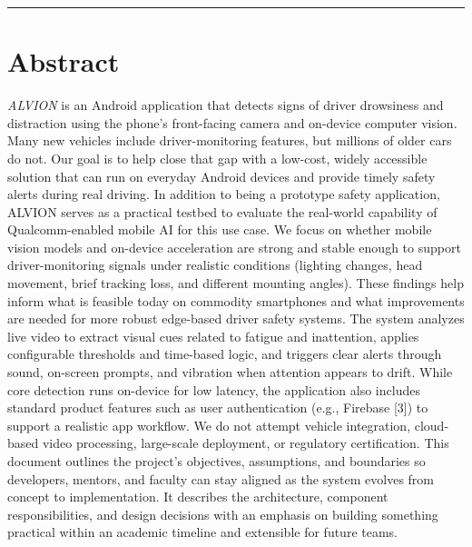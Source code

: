 \documentclass[11pt]{report}
\begin{document}


\clearpage

\setcounter{page}{1}



\tableofcontents
{\color{qcRed}\rule{16cm}{2pt}}

\clearpage

\chapter{Abstract}
\textit{ALVION} is an Android application that detects signs of driver drowsiness and distraction using the phone’s front-facing camera and on-device computer vision. Many new vehicles include driver-monitoring features, but millions of older cars do not. Our goal is to help close that gap with a low-cost, widely accessible solution that can run on everyday Android devices and provide timely safety alerts during real driving.
In addition to being a prototype safety application, ALVION serves as a practical testbed to evaluate the real-world capability of Qualcomm-enabled mobile AI for this use case. We focus on whether mobile vision models and on-device acceleration are strong and stable enough to support driver-monitoring signals under realistic conditions (lighting changes, head movement, brief tracking loss, and different mounting angles). These findings help inform what is feasible today on commodity smartphones and what improvements are needed for more robust edge-based driver safety systems.
The system analyzes live video to extract visual cues related to fatigue and inattention, applies configurable thresholds and time-based logic, and triggers clear alerts through sound, on-screen prompts, and vibration when attention appears to drift. While core detection runs on-device for low latency, the application also includes standard product features such as user authentication (e.g., Firebase [3]) to support a realistic app workflow. We do not attempt vehicle integration, cloud-based video processing, large-scale deployment, or regulatory certification.
This document outlines the project’s objectives, assumptions, and boundaries so developers, mentors, and faculty can stay aligned as the system evolves from concept to implementation. It describes the architecture, component responsibilities, and design decisions with an emphasis on building something practical within an academic timeline and extensible for future teams.
\end{document}
